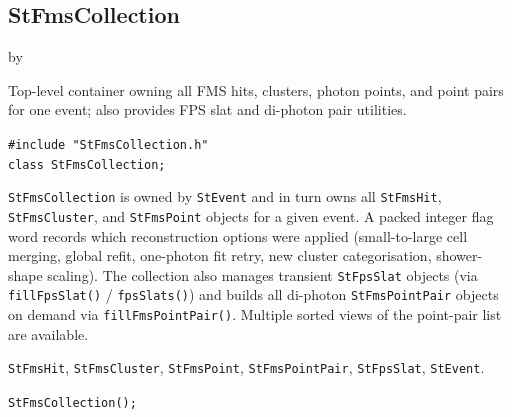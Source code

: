 \documentclass[twoside]{article}
\newcommand{\entrylabel}[1]{\mbox{\textbf{{#1}}}\hfil}%
\newenvironment{entry}
{\begin{list}{}%
    {\renewcommand{\makelabel}{\entrylabel}%
     \setlength{\labelwidth}{90pt}%
     \setlength{\leftmargin}{\labelwidth}
     \advance\leftmargin by \labelsep%
      }%
    }%
  {\end{list}}
\newcommand{\Entrylabel}[1]%
{\raisebox{0pt}[1ex][0pt]{\makebox[\labelwidth][l]%
    {\parbox[t]{\labelwidth}{\hspace{0pt}\textbf{{#1}}}}}}
\newenvironment{Entry}%
{\renewcommand{\entrylabel}{\Entrylabel}\begin{entry}}%
  {\end{entry}}
\begin{document}
\subsection{StFmsCollection}
\label{sec:StFmsCollection}
\begin{Entry}
\item[Summary]
    Top-level container owning all FMS hits, clusters, photon points, and
    point pairs for one event; also provides FPS slat and di-photon pair
    utilities.

\item[Synopsis]
    \verb+#include "StFmsCollection.h"+\\
    \verb+class StFmsCollection;+\\

\item[Description]
    \texttt{StFmsCollection} is owned by \texttt{StEvent} and in turn owns
    all \texttt{StFmsHit}, \texttt{StFmsCluster}, and \texttt{StFmsPoint}
    objects for a given event.  A packed integer flag word records which
    reconstruction options were applied (small-to-large cell merging, global
    refit, one-photon fit retry, new cluster categorisation, shower-shape
    scaling).  The collection also manages transient \texttt{StFpsSlat}
    objects (via \texttt{fillFpsSlat()} / \texttt{fpsSlats()}) and builds
    all di-photon \texttt{StFmsPointPair} objects on demand via
    \texttt{fillFmsPointPair()}.  Multiple sorted views of the point-pair
    list are available.

\item[Related Classes]
    \texttt{StFmsHit}, \texttt{StFmsCluster}, \texttt{StFmsPoint},
    \texttt{StFmsPointPair}, \texttt{StFpsSlat}, \texttt{StEvent}.

\item[Public\\ Constructors]
    \verb+StFmsCollection();+\\


\end{Entry}
\end{document}
